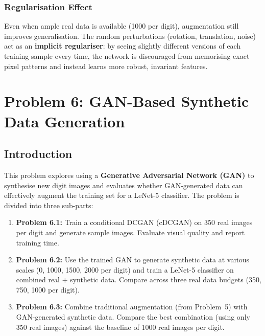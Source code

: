 \documentclass[12pt, a4paper]{article}
\begin{document}
\subsubsection{Regularisation Effect}

Even when ample real data is available (1000 per digit), augmentation still improves
generalisation. The random perturbations (rotation, translation, noise) act as an
\textbf{implicit regulariser}: by seeing slightly different versions of each training
sample every time, the network is discouraged from memorising exact pixel patterns
and instead learns more robust, invariant features.

\newpage

\section{Problem 6: GAN-Based Synthetic Data Generation}

\subsection{Introduction}

This problem explores using a \textbf{Generative Adversarial Network (GAN)} to
synthesise new digit images and evaluates whether GAN-generated data can effectively
augment the training set for a LeNet-5 classifier. The problem is divided into three
sub-parts:

\begin{enumerate}
    \item \textbf{Problem 6.1:} Train a conditional DCGAN (cDCGAN) on 350 real images
          per digit and generate sample images. Evaluate visual quality and report
          training time.
    \item \textbf{Problem 6.2:} Use the trained GAN to generate synthetic data at
          various scales (0, 1000, 1500, 2000 per digit) and train a LeNet-5 classifier
          on combined real + synthetic data. Compare across three real data budgets
          (350, 750, 1000 per digit).
    \item \textbf{Problem 6.3:} Combine traditional augmentation (from Problem~5) with
          GAN-generated synthetic data. Compare the best combination (using only 350
          real images) against the baseline of 1000 real images per digit.
\end{enumerate}
\end{document}

